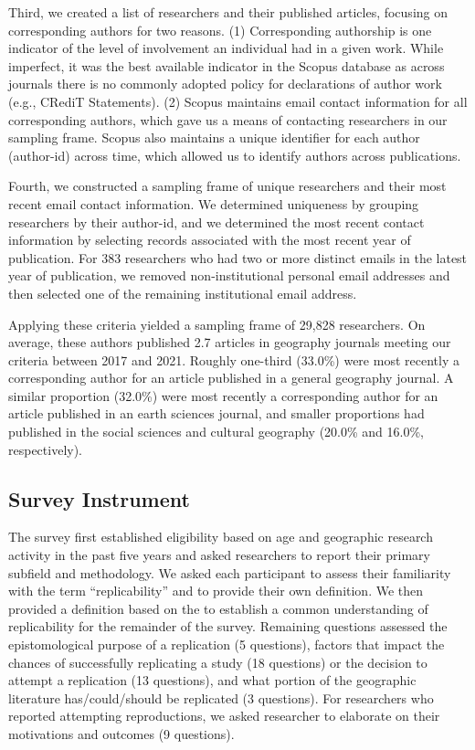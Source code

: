 \documentclass[]{interact}
\theoremstyle{plain}%
\theoremstyle{definition}
\theoremstyle{remark}
\begin{document}
Third, we created a list of researchers and their published articles, focusing on corresponding authors for two reasons.
(1) Corresponding authorship is one indicator of the level of involvement an individual had in a given work. 
While imperfect, it was the best available indicator in the Scopus database as across journals there is no commonly adopted policy for declarations of author work (e.g., CRediT Statements).
(2) Scopus maintains email contact information for all corresponding authors, which gave us a means of contacting researchers in our sampling frame.
Scopus also maintains a unique identifier for each author (author-id) across time, which allowed us to identify authors across publications. 

Fourth, we constructed a sampling frame of unique researchers and their most recent email contact information. 
We determined uniqueness by grouping researchers by their author-id, and we determined the most recent contact information by selecting records associated with the most recent year of publication. 
For 383 researchers who had two or more distinct emails in the latest year of publication, we removed non-institutional personal email addresses and then selected one of the remaining institutional email address.

Applying these criteria yielded a sampling frame of 29,828 researchers. 
On average, these authors published 2.7 articles in geography journals meeting our criteria between 2017 and 2021. 
Roughly one-third (33.0\%) were most recently a corresponding author for an article published in a general geography journal. 
A similar proportion (32.0\%) were most recently a corresponding author for an article published in an earth sciences journal, and smaller proportions had published in the social sciences and cultural geography (20.0\% and 16.0\%, respectively).

\subsection*{Survey Instrument}
The survey first established eligibility based on age and geographic research activity in the past five years and asked researchers to report their primary subfield and methodology.
We asked each participant to assess their familiarity with the term ``replicability'' and to provide their own definition. 
We then provided a definition based on the \citet{nosek2020replication}  to establish a common understanding of replicability for the remainder of the survey.
Remaining questions assessed the epistomological purpose of a replication (5 questions), factors that impact the chances of successfully replicating a study (18 questions) or the decision to attempt a replication (13 questions), and what portion of the geographic literature has/could/should be replicated (3 questions).
For researchers who reported attempting reproductions, we asked researcher to elaborate on their motivations and outcomes (9 questions).
\end{document}
